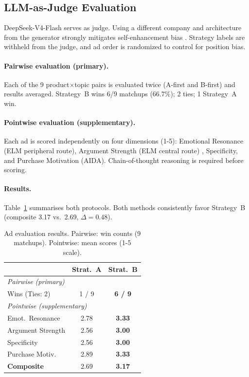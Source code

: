 \documentclass[11pt]{article}
\begin{document}
\subsection{LLM-as-Judge Evaluation}
\label{sec:judge}

DeepSeek-V4-Flash serves as judge.
Using a different company and architecture from the generator
strongly mitigates self-enhancement bias \cite{zheng2023judging}.
Strategy labels are withheld from the judge, and ad order is
randomized to control for position bias.

\paragraph{Pairwise evaluation (primary).}
Each of the 9 product$\times$topic pairs is evaluated twice
(A-first and B-first) and results averaged.
Strategy~B wins 6/9 matchups (66.7\%); 2 ties; 1 Strategy~A win.

\paragraph{Pointwise evaluation (supplementary).}
Each ad is scored independently on four dimensions (1-5):
Emotional Resonance (ELM peripheral route), Argument Strength
(ELM central route) \cite{petty1986elm}, Specificity, and Purchase
Motivation (AIDA).
Chain-of-thought reasoning is required before scoring.

\paragraph{Results.}
Table~\ref{tab:ads} summarises both protocols.
Both methods consistently favor Strategy~B (composite 3.17 vs.\
2.69, $\Delta{=}0.48$).

\begin{table}[t]
\centering
\small
\setlength{\tabcolsep}{4pt}
\caption{Ad evaluation results. Pairwise: win counts (9 matchups).
Pointwise: mean scores (1-5 scale).}
\label{tab:ads}
\begin{tabular}{lcc}
\toprule
& \textbf{Strat.\ A} & \textbf{Strat.\ B} \\
\midrule
\multicolumn{3}{l}{\textit{Pairwise (primary)}} \\
\quad Wins (Ties: 2)  & 1 / 9  & \textbf{6 / 9} \\[3pt]
\multicolumn{3}{l}{\textit{Pointwise (supplementary)}} \\
\quad Emot.\ Resonance   & 2.78 & \textbf{3.33} \\
\quad Argument Strength  & 2.56 & \textbf{3.00} \\
\quad Specificity        & 2.56 & \textbf{3.00} \\
\quad Purchase Motiv.\   & 2.89 & \textbf{3.33} \\
\quad \textbf{Composite} & 2.69 & \textbf{3.17} \\
\bottomrule
\end{tabular}
\end{table}
\end{document}
